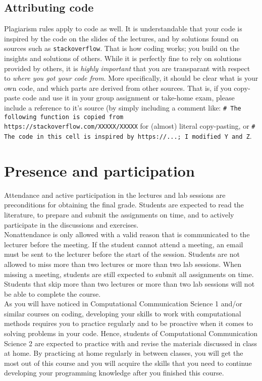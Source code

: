 \documentclass[a4paper,10pt,twocolumn]{report}
\begin{document}
		\subsection{Attributing code}
		Plagiarism rules apply to code as well. It is understandable that your code is inspired by the code on the slides of the lectures, and by solutions found on sources such as \texttt{stackoverflow}. That is how coding works; you build on the insights and solutions of others. While it is perfectly fine to rely on solutions provided by others, it is \emph{highly important} that you are transparant with respect to \emph{where you got your code from}. More specifically, it should be clear what is your own code, and which parts are derived from other sources. That is, if you copy-paste code and use it in your group assignment or take-home exam, please include a reference to it's source (by simply including a comment like: \texttt{# The following function is copied from https://stackoverflow.com/XXXXX/XXXXX} for (almost) literal copy-pasting, or \texttt{\# The code in this cell is inspired by https://...; I modified Y and Z}. 
	
	\section{Presence and participation}
	Attendance and active participation in the lectures and lab sessions are preconditions for obtaining the final grade. Students are expected to read the literature, to prepare and submit the assignments on time, and to actively participate in the discussions and exercises. \\

	Nonattendance is only allowed with a valid reason that is communicated to the lecturer before the meeting. If the student cannot attend a meeting, an email must be sent to the lecturer before the start of the session. Students are not allowed to miss more than two lectures or more than two lab sessions. When missing a meeting, students are still expected to submit all assignments on time. Students that skip more than two lectures or more than two lab sessions will not be able to complete the course. \\
	
	As you will have noticed in Computational Communication Science 1 and/or similar courses on coding, developing your skills to work with computational methods requires you to practice regularly and to be proactive when it comes to solving problems in your code. Hence, students of Computational Communication Science 2 are expected to practice with and revise the materials discussed in class at home. By practicing at home regularly in between classes, you will get the most out of this course and you will acquire the skills that you need to continue developing your programming knowledge after you finished this course. \\
\end{document}
